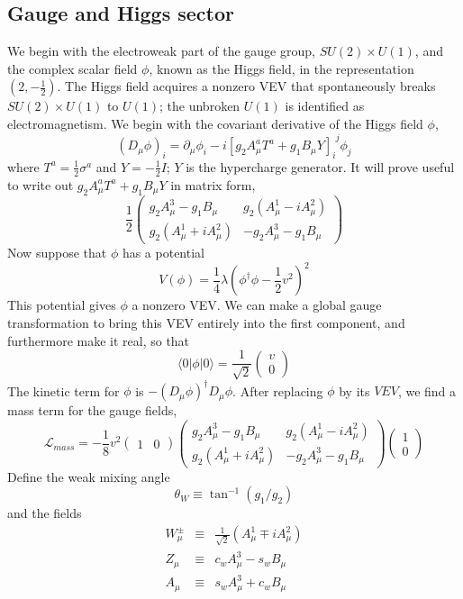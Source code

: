 \documentclass[cyan]{elegantnote}
\begin{document}
\subsection{Gauge and Higgs sector}
We begin with the electroweak part of the gauge group, $SU(2)\times U(1)$, and the complex scalar field $\phi$, known as the Higgs field, in the representation $(2,-\frac{1}{2})$. The Higgs field acquires a nonzero VEV that spontaneously breaks $SU(2)\times U(1)$ to $U(1)$; the unbroken $U(1)$ is identified as electromagnetism.
We begin with the covariant derivative of the Higgs field $\phi$,
\[(D_{\mu}\phi)_i = \partial_{\mu}\phi_i - i[g_2 A^a_{\mu}T^a + g_1B_{\mu}Y]_{i}^{\phantom{i}j} \phi_j\] where $T^a = \frac{1}{2}\sigma^a$ and $Y = -\frac{1}{2}I$; $Y$ is the hypercharge generator. It will prove
useful to write out $g_2 A^a_{\mu}T^a + g_1B_{\mu}Y$ in matrix form,
\[ \frac{1}{2} \begin{pmatrix}
g_2A^3_{\mu}-g_1B_{\mu} & g_2(A^1_{\mu} - iA^2_{\mu}) \\
g_2(A^1_{\mu} + iA^2_{\mu}) & -g_2A^3_{\mu}-g_1B_{\mu}
\end{pmatrix}\]
Now suppose that $\phi$ has a potential
\[V(\phi) = \frac{1}{4}\lambda (\phi^{\dagger}\phi - \frac{1}{2}v^2)^2\]
This potential gives $\phi$ a nonzero VEV. We can make a global gauge transformation to bring this VEV entirely into the first component, and furthermore make it real, so that
\[\langle 0 | \phi | 0 \rangle =  \frac{1}{\sqrt{2}}\begin{pmatrix}
v \\ 0
\end{pmatrix} \]
The kinetic term for $\phi$ is $-(D_{\mu}\phi)^{\dagger}D_{\mu}\phi$. After replacing $\phi$ by its $VEV$, we find a mass term for the gauge fields,
\[\mathcal{L}_{mass}  = - \frac{1}{8}v^2 \begin{pmatrix}
1 & 0 \end{pmatrix} \begin{pmatrix}
g_2A^3_{\mu}-g_1B_{\mu} & g_2(A^1_{\mu} - iA^2_{\mu}) \\
g_2(A^1_{\mu} + iA^2_{\mu}) & -g_2A^3_{\mu}-g_1B_{\mu}
\end{pmatrix} \begin{pmatrix} 1 \\ 0 \end{pmatrix} \]
Define the weak mixing angle
\[\theta_W \equiv \tan^{-1}(g_1/g_2)\]
and the fields
\begin{eqnarray}
W^{\pm}_{\mu} &\equiv & \frac{1}{\sqrt{2}} (A^1_{\mu} \mp iA^2_{\mu}) \nonumber \\
Z_{\mu}  &\equiv & c_w A^3_{\mu} - s_w B_{\mu} \nonumber \\
A_{\mu}  &\equiv & s_w A^3_{\mu} + c_w B_{\mu} \nonumber
\end{eqnarray}
\end{document}
